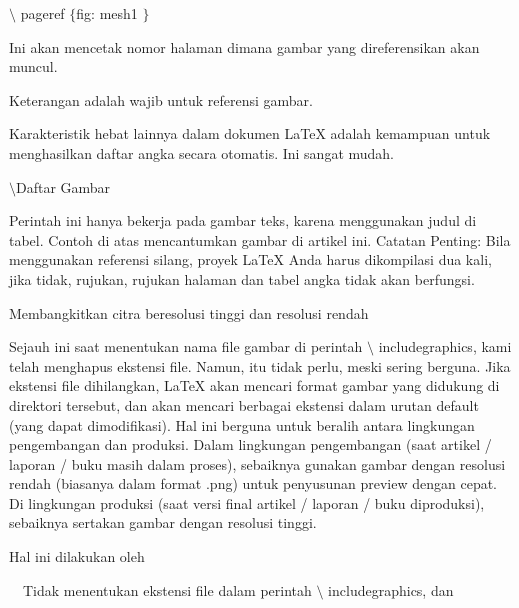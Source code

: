 \vspace{12pt}
\noindent
 $  \setminus $ pageref  $  \{  $fig: mesh1 $  \}  $ \par
\noindent
Ini akan mencetak nomor halaman dimana gambar yang direferensikan akan muncul. \par
\vspace{12pt}
\noindent
Keterangan adalah wajib untuk referensi gambar. \par
\vspace{12pt}
\noindent
Karakteristik hebat lainnya dalam dokumen LaTeX adalah kemampuan untuk menghasilkan daftar angka secara otomatis. Ini sangat mudah. \par
\vspace{12pt}
\noindent
 $  \setminus $Daftar Gambar \par
\vspace{12pt}
\vspace{16pt}
\noindent
Perintah ini hanya bekerja pada gambar teks, karena menggunakan judul di tabel. Contoh di atas mencantumkan gambar di artikel ini. Catatan Penting: Bila menggunakan referensi silang, proyek LaTeX Anda harus dikompilasi dua kali, jika tidak, rujukan, rujukan halaman dan tabel angka tidak akan berfungsi. \par
\vspace{16pt}
\noindent
Membangkitkan citra beresolusi tinggi dan resolusi rendah \par
\vspace{12pt}
\noindent
 \hspace*{0.5in} Sejauh ini saat menentukan nama file gambar di perintah  $  \setminus $ includegraphics, kami telah menghapus ekstensi file. Namun, itu tidak perlu, meski sering berguna. Jika ekstensi file dihilangkan, LaTeX akan mencari format gambar yang didukung di direktori tersebut, dan akan mencari berbagai ekstensi dalam urutan default (yang dapat dimodifikasi). Hal ini berguna untuk beralih antara lingkungan pengembangan dan produksi. Dalam lingkungan pengembangan (saat artikel / laporan / buku masih dalam proses), sebaiknya gunakan gambar dengan resolusi rendah (biasanya dalam format .png) untuk penyusunan preview dengan cepat. Di lingkungan produksi (saat versi final artikel / laporan / buku diproduksi), sebaiknya sertakan gambar dengan resolusi tinggi. \par
\vspace{12pt}
\noindent
Hal ini dilakukan oleh \par
\vspace{12pt}
\noindent
 $  $ $  $ $  $ $  $Tidak menentukan ekstensi file dalam perintah  $  \setminus $ includegraphics, dan \par
